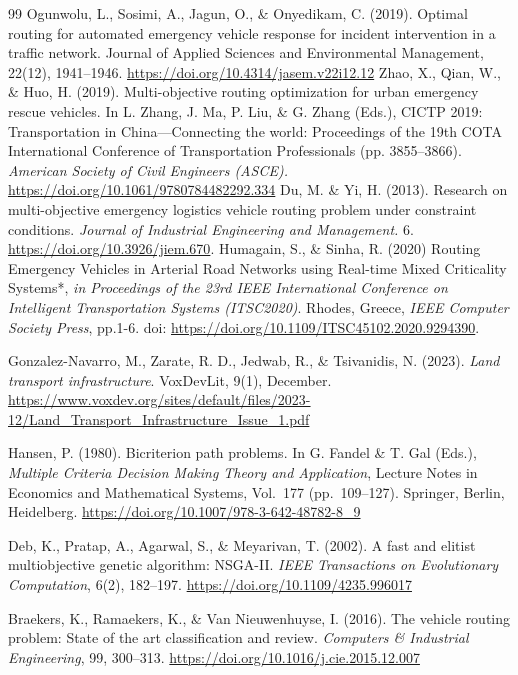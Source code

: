 \documentclass[paper=A4, 12pt, mathscr]{report}
\begin{document}
\begin{thebibliography}{99}
		 Ogunwolu, L., Sosimi, A., Jagun, O., \& Onyedikam, C. (2019). Optimal routing for automated emergency vehicle response for incident intervention in a traffic network. Journal of Applied Sciences and Environmental Management, 22(12), 1941–1946. \url{https://doi.org/10.4314/jasem.v22i12.12}
		 Zhao, X., Qian, W., \& Huo, H. (2019). Multi-objective routing optimization for urban emergency rescue vehicles. In L. Zhang, J. Ma, P. Liu, \& G. Zhang (Eds.), CICTP 2019: Transportation in China—Connecting the world: Proceedings of the 19th COTA International Conference of Transportation Professionals (pp. 3855–3866). \textit{American Society of Civil Engineers (ASCE).} \url{https://doi.org/10.1061/9780784482292.334}
		Du, M. \& Yi, H. (2013). Research on multi-objective emergency logistics vehicle routing problem under constraint conditions. \textit{Journal of Industrial Engineering and Management.} 6. \url{https://doi.org/10.3926/jiem.670}. 
		Humagain, S., \& Sinha, R. (2020) Routing Emergency Vehicles in Arterial Road
		Networks using Real-time Mixed Criticality Systems*, \textit{in Proceedings of the 23rd IEEE	International Conference on Intelligent Transportation Systems (ITSC2020)}. Rhodes, Greece, \textit{IEEE Computer Society Press}, pp.1-6. doi: \url{https://doi.org/10.1109/ITSC45102.2020.9294390}.
		
		 Gonzalez-Navarro, M., Zarate, R. D., Jedwab, R., \& Tsivanidis, N. (2023). \textit{Land transport infrastructure}. VoxDevLit, 9(1), December. \url{ https://www.voxdev.org/sites/default/files/2023-12/Land_Transport_Infrastructure_Issue_1.pdf}
		
		Hansen, P. (1980).
		Bicriterion path problems.
		In G. Fandel \& T. Gal (Eds.),
		\textit{Multiple Criteria Decision Making Theory and Application},
		Lecture Notes in Economics and Mathematical Systems, Vol.~177 (pp.~109--127).
		Springer, Berlin, Heidelberg.
		\url{https://doi.org/10.1007/978-3-642-48782-8_9}
		
		Deb, K., Pratap, A., Agarwal, S., \& Meyarivan, T. (2002).
		A fast and elitist multiobjective genetic algorithm: NSGA-II.
		\textit{IEEE Transactions on Evolutionary Computation}, 6(2), 182--197.
		\url{https://doi.org/10.1109/4235.996017}
		
		Braekers, K., Ramaekers, K., \& Van Nieuwenhuyse, I. (2016).
		The vehicle routing problem: State of the art classification and review.
		\textit{Computers \& Industrial Engineering}, 99, 300--313.
		\url{https://doi.org/10.1016/j.cie.2015.12.007}
		

\end{thebibliography}
\end{document}
